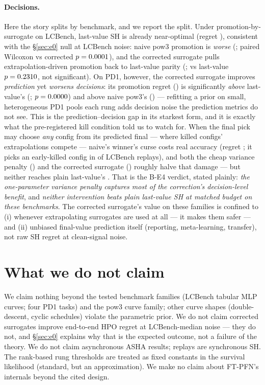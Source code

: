 \documentclass[10pt]{article}
\begin{document}
\paragraph{Decisions.} Here the story splits by benchmark, and we report
the split. Under promotion-by-surrogate on LCBench, last-value SH is
already near-optimal (regret \RegLCBLast{}), consistent with the
\S\ref{sec:e0} null at LCBench noise: naive pow3 promotion is \emph{worse}
(\RegLCBPow; paired Wilcoxon vs corrected $p = 0.0001$), and the
corrected surrogate pulls extrapolation-driven promotion back to
last-value parity (\RegLCBEB; vs last-value $p = 0.2310$, not
significant). On PD1, however, the corrected surrogate improves
\emph{prediction} yet \emph{worsens decisions}: its promotion regret
(\RegPDEB) is significantly \emph{above} last-value's (\RegPDLast;
$p = 0.0000$) and above naive pow3's (\RegPDPow) --- refitting a
prior on small, heterogeneous PD1 pools each rung adds decision noise the
prediction metrics do not see. This is the prediction--decision gap in its
starkest form, and it is exactly what the pre-registered kill condition
told us to watch for. When the final pick may choose \emph{any} config
from its predicted final --- where killed configs' extrapolations compete
--- naive's winner's curse costs real accuracy (regret \RegAllLCBPow{}; it
picks an early-killed config in \AllpickKilledFracPowLCB{} of LCBench
replays), and both the cheap variance penalty (\RegAllLCBPowVpen) and the
corrected surrogate (\RegAllLCBEB) roughly halve that damage --- but
neither reaches plain last-value's \RegAllLCBLast{}. That is the B-E4
verdict, stated plainly: \emph{the one-parameter variance penalty captures
most of the correction's decision-level benefit}, and \emph{neither
intervention beats plain last-value SH at matched budget on these
benchmarks}. The corrected surrogate's value on these families is confined
to (i) whenever extrapolating surrogates are used at all --- it makes them
safer --- and (ii) unbiased final-value prediction itself (reporting,
meta-learning, transfer), not raw SH
regret at clean-signal noise.

\section{What we do not claim}

We claim nothing beyond the tested benchmark families (LCBench tabular
MLP curves; four PD1 tasks) and the pow3 curve family; other curve
shapes (double-descent, cyclic schedules) violate the parametric prior.
We do not claim corrected surrogates improve end-to-end HPO regret at
LCBench-median noise --- they do not, and \S\ref{sec:e0} explains why
that is the expected outcome, not a failure of the theory. We do not
claim asynchronous ASHA results; replays are synchronous SH. The
rank-based rung thresholds are treated as fixed constants in the
survival likelihood (standard, but an approximation). We make no claim
about FT-PFN's internals beyond the cited design.
\end{document}
